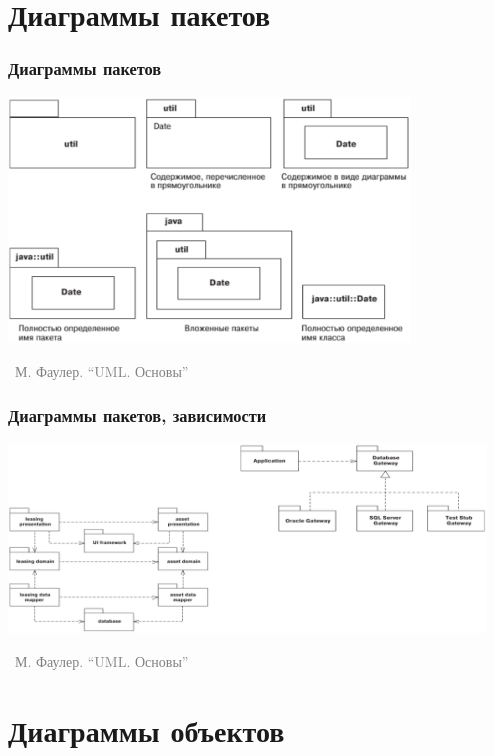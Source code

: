 \documentclass[xetex,mathserif,serif]{beamer}
\newcommand{\attribution}[1] {
	\vspace{-5mm}\begin{flushright}\begin{scriptsize}\textcolor{gray}{\textcopyright\, #1}\end{scriptsize}\end{flushright}
}
\begin{document}
	\section{Диаграммы пакетов}

	\begin{frame}
		\frametitle{Диаграммы пакетов}
		\begin{center}
			\includegraphics[width=0.8\textwidth]{packageDiagrams.png}
			\attribution{М. Фаулер. ``UML. Основы''}
		\end{center}
	\end{frame}

	\begin{frame}
		\frametitle{Диаграммы пакетов, зависимости}
		\begin{center}
			\includegraphics[width=0.95\textwidth]{packageDependencies.png}
			\attribution{М. Фаулер. ``UML. Основы''}
		\end{center}
	\end{frame}

	\section{Диаграммы объектов}
\end{document}
